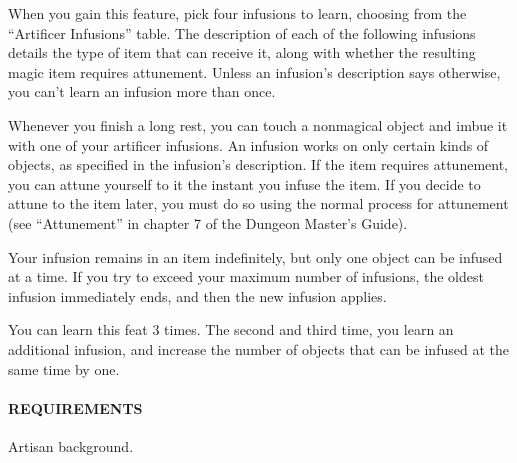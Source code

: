         When you gain this feature, pick four infusions to learn, choosing from the ``Artificer Infusions'' table.
        The description of each of the following infusions details the type of item that can receive it, along with whether the resulting magic item requires attunement.
        Unless an infusion's description says otherwise, you can't learn an infusion more than once.

        Whenever you finish a long rest, you can touch a nonmagical object and imbue it with one of your artificer infusions.
        An infusion works on only certain kinds of objects, as specified in the infusion's description.
        If the item requires attunement, you can attune yourself to it the instant you infuse the item.
        If you decide to attune to the item later, you must do so using the normal process for attunement (see ``Attunement'' in chapter 7 of the Dungeon Master's Guide).

        Your infusion remains in an item indefinitely, but only one object can be infused at a time.
        If you try to exceed your maximum number of infusions, the oldest infusion immediately ends, and then the new infusion applies.

        You can learn this feat 3 times.
        The second and third time, you learn an additional infusion, and increase the number of objects that can be infused at the same time by one.

        \paragraph{REQUIREMENTS} Artisan background.

